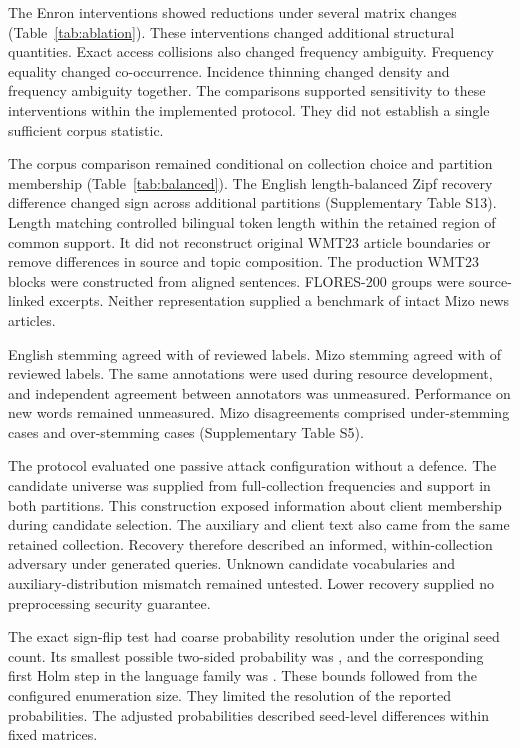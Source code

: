 \documentclass[12pt]{article}
\begin{document}
The Enron interventions showed reductions under several matrix changes (Table~\ref{tab:ablation}). These interventions changed additional structural quantities. Exact access collisions also changed frequency ambiguity. Frequency equality changed co-occurrence. Incidence thinning changed density and frequency ambiguity together. The comparisons supported sensitivity to these interventions within the implemented protocol. They did not establish a single sufficient corpus statistic.

The corpus comparison remained conditional on collection choice and partition membership (Table~\ref{tab:balanced}). The English length-balanced Zipf recovery difference changed sign across additional partitions (Supplementary Table S13). Length matching controlled bilingual token length within the retained region of common support. It did not reconstruct original WMT23 article boundaries or remove differences in source and topic composition. The production WMT23 blocks were constructed from aligned sentences. FLORES-200 groups were source-linked excerpts. Neither representation supplied a benchmark of intact Mizo news articles.

English stemming agreed with \EnglishStemMatched{} of \EnglishStemTotal{} reviewed labels. Mizo stemming agreed with \MizoStemMatched{} of \MizoStemTotal{} reviewed labels. The same annotations were used during resource development, and independent agreement between annotators was unmeasured. Performance on new words remained unmeasured. Mizo disagreements comprised \UnderStemming{} under-stemming cases and \OverStemming{} over-stemming cases (Supplementary Table S5).

The protocol evaluated one passive attack configuration without a defence. The candidate universe was supplied from full-collection frequencies and support in both partitions. This construction exposed information about client membership during candidate selection. The auxiliary and client text also came from the same retained collection. Recovery therefore described an informed, within-collection adversary under generated queries. Unknown candidate vocabularies and auxiliary-distribution mismatch remained untested. Lower recovery supplied no preprocessing security guarantee.

The exact sign-flip test had coarse probability resolution under the original seed count. Its smallest possible two-sided probability was \SignFlipMinimum{}, and the corresponding first Holm step in the language family was \LanguageHolmFloor{}. These bounds followed from the configured enumeration size. They limited the resolution of the reported probabilities. The adjusted probabilities described seed-level differences within fixed matrices.
\end{document}
